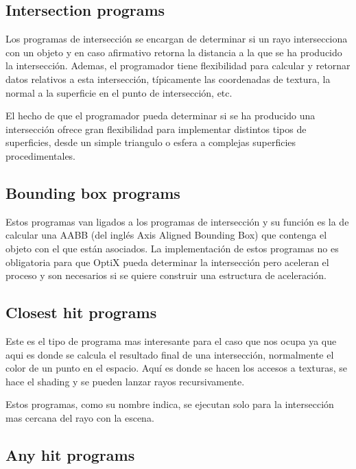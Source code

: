\subsection{Intersection programs}

Los programas de intersección se encargan de determinar si un rayo intersecciona con un objeto y en caso afirmativo retorna la distancia a la que se ha producido la intersección. Ademas, el programador tiene flexibilidad para calcular y retornar datos relativos a esta intersección, típicamente las coordenadas de textura, la normal a la superficie en el punto de intersección, etc.

\medskip

El hecho de que el programador pueda determinar si se ha producido una intersección ofrece gran flexibilidad para implementar distintos tipos de superficies, desde un simple triangulo o esfera a complejas superficies procedimentales.

\subsection{Bounding box programs}

Estos programas van ligados a los programas de intersección y su función es la de calcular una AABB (del inglés Axis Aligned Bounding Box) que contenga el objeto con el que están asociados. La implementación de estos programas no es obligatoria para que OptiX pueda determinar la intersección pero aceleran el proceso y son necesarios si se quiere construir una estructura de aceleración.

\subsection{Closest hit programs}

Este es el tipo de programa mas interesante para el caso que nos ocupa ya que aqui es donde se calcula el resultado final de una intersección, normalmente el color de un punto en el espacio. Aquí es donde se hacen los accesos a texturas, se hace el shading y se pueden lanzar rayos recursivamente.

\medskip

Estos programas, como su nombre indica, se ejecutan solo para la intersección mas cercana del rayo con la escena.

\subsection{Any hit programs}

